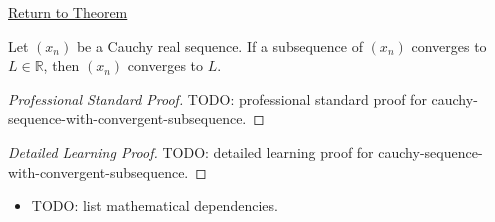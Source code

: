 \newpage
{}
\label{prf:cauchy-sequence-with-convergent-subsequence}

\begin{remark*}[Return]
\hyperref[thm:cauchy-sequence-with-convergent-subsequence]{Return to Theorem}
\end{remark*}

\begin{theorem*}
Let $(x_n)$ be a Cauchy real sequence. If a subsequence of $(x_n)$
converges to $L\in\mathbb{R}$, then $(x_n)$ converges to $L$.

\smallskip
\noindent
\end{theorem*}

\begin{proof}[Professional Standard Proof]
\LRAProofBodyStart
TODO: professional standard proof for cauchy-sequence-with-convergent-subsequence.
\end{proof}

\begin{proof}[Detailed Learning Proof]
\LRAProofBodyStart
TODO: detailed learning proof for cauchy-sequence-with-convergent-subsequence.
\end{proof}

\begin{remark*}
\end{remark*}

\begin{dependencies}
\begin{itemize}
  \item TODO: list mathematical dependencies.
\end{itemize}
\end{dependencies}

\clearpage
